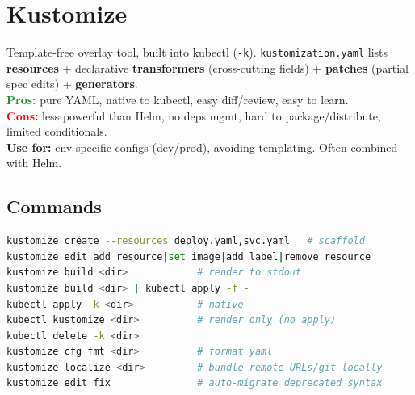 \section{Kustomize}
Template-free overlay tool, built into kubectl (\texttt{-k}). \texttt{kustomization.yaml} lists \textbf{resources} + declarative \textbf{transformers} (cross-cutting fields) + \textbf{patches} (partial spec edits) + \textbf{generators}. \\
\textcolor{ForestGreen}{\textbf{Pros:}} pure YAML, native to kubectl, easy diff/review, easy to learn. \\
\textcolor{red}{\textbf{Cons:}} less powerful than Helm, no deps mgmt, hard to package/distribute, limited conditionals. \\
\textbf{Use for:} env-specific configs (dev/prod), avoiding templating. Often combined with Helm.

\subsection{Commands}
\begin{lstlisting}[language=sh]
kustomize create --resources deploy.yaml,svc.yaml   # scaffold
kustomize edit add resource|set image|add label|remove resource
kustomize build <dir>            # render to stdout
kustomize build <dir> | kubectl apply -f -
kubectl apply -k <dir>           # native
kubectl kustomize <dir>          # render only (no apply)
kubectl delete -k <dir>
kustomize cfg fmt <dir>          # format yaml
kustomize localize <dir>         # bundle remote URLs/git locally
kustomize edit fix               # auto-migrate deprecated syntax
\end{lstlisting}

